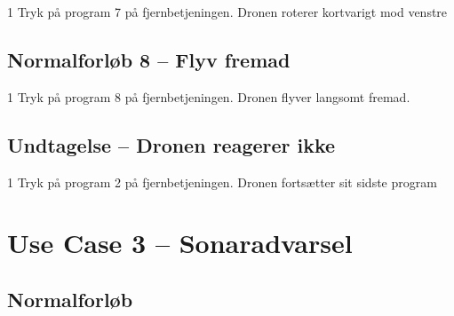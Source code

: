 \documentclass[Main]{subfiles}
\begin{document}
\begin{TestCase}
\TC
{1}
{Tryk på program 7 på fjernbetjeningen.}
{Dronen roterer kortvarigt mod venstre}
{}
\end{TestCase}




\subsection*{Normalforløb 8 -- Flyv fremad}

\begin{TestCaseIntro}
\end{TestCaseIntro}

\begin{TestCase}
\TC
{1}
{Tryk på program 8 på fjernbetjeningen.}
{Dronen flyver langsomt fremad.}
{}
\end{TestCase}





\subsection*{Undtagelse -- Dronen reagerer ikke}

\begin{TestCaseIntro}
\end{TestCaseIntro}

\begin{TestCase}
\TC
{1}
{Tryk på program 2 på fjernbetjeningen.}
{Dronen fortsætter sit sidste program}
{}
\end{TestCase}









\newpage
\section{Use Case 3 -- Sonaradvarsel}

\subsection*{Normalforløb}
\end{document}
